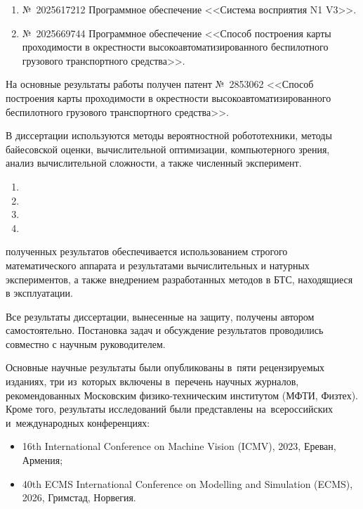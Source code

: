 \begin{enumerate}
	\item №~2025617212 Программное обеспечение <<Система восприятия N1 V3>>.
	\item №~2025669744 Программное обеспечение <<Способ построения карты проходимости в окрестности высокоавтоматизированного беспилотного грузового транспортного средства>>.
\end{enumerate}

На основные результаты работы получен патент №~2853062 <<Способ построения карты проходимости в окрестности высокоавтоматизированного беспилотного грузового транспортного средства>>.

{\methods} В диссертации используются методы вероятностной робототехники, методы байесовской оценки, вычислительной оптимизации, компьютерного зрения, анализ вычислительной сложности, а также численный эксперимент.

{}

\begin{enumerate}[beginpenalty=10000] %
  \item {}
  \item {}
  \item {}
  \item {}
\end{enumerate}

{\reliability} полученных результатов обеспечивается использованием строгого математического аппарата и результатами вычислительных и натурных экспериментов, а также внедрением разработанных методов в БТС, находящиеся в эксплуатации.

{\contribution} Все результаты диссертации, вынесенные на защиту, получены автором самостоятельно. Постановка задач и обсуждение результатов проводились совместно с научным руководителем.

{\publications} Основные научные результаты были опубликованы в~пяти рецензируемых изданиях, три из~которых включены в~перечень научных журналов, рекомендованных Московским физико-техническим институтом (МФТИ, Физтех). Кроме того, результаты исследований были представлены на~всероссийских и~международных конференциях:
\begin{itemize}
	\item 16th International Conference on Machine Vision (ICMV), 2023, Ереван, Армения;
	\item 40th ECMS International Conference on Modelling and Simulation (ECMS), 2026, Гримстад, Норвегия.
\end{itemize}

